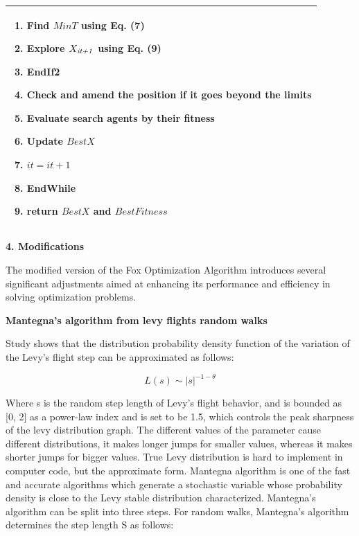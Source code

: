 \documentclass[
]{article}
\begin{document}
\begin{justify}
{\begin{longtable}{@{}p{\dimexpr\linewidth-2\tabcolsep\relax}@{}}
\begin{minipage}[t]{\linewidth}
\begin{enumerate}
  \item \hspace{1cm} Find $MinT$ using Eq. (7)
  \item \hspace{1cm} Explore $X_{\text{\textit{it+1}}}$ using Eq. (9)
  \item \hspace{0.5cm} \textbf{EndIf2}
  \item \hspace{0.5cm} Check and amend the position if it goes beyond the limits
  \item \hspace{0.5cm} Evaluate search agents by their fitness
  \item \hspace{0.5cm} Update $BestX$
  \item \hspace{0.5cm} $it=it+1$
  \item \textbf{EndWhile}
  \item return $BestX$ and $BestFitness$
\end{enumerate}
\end{minipage} \\
\bottomrule
\end{longtable}

\def\labelenumi{\arabic{enumi}.}
\item
\vspace{5mm}
  \textbf{4. Modifications}

The modified version of the Fox Optimization Algorithm introduces several significant adjustments aimed at enhancing its performance and efficiency in solving optimization problems.

\textbf{Mantegna’s algorithm from levy flights random walks}

Study shows that the distribution probability density function of the variation of the Levy’s flight step can be approximated as follows:

\begin{equation}
L(s) \sim |s|^{-1 - \theta} \tag{10}
\end{equation}

Where s is the random step length of Levy’s flight behavior, and 
 is bounded as [0, 2] as a power-law index and is set to be 1.5, which controls the peak sharpness of the levy distribution graph. The different values of the parameter 
 cause different distributions, it makes longer jumps for smaller values, whereas it makes shorter jumps for bigger values. True Levy distribution is hard to implement in computer code, but the approximate form. Mantegna algorithm is one of the fast and accurate algorithms which generate a stochastic variable whose probability density is close to the Levy stable distribution characterized. Mantegna’s algorithm can be split into three steps. For random walks, Mantegna’s algorithm determines the step length S as follows:

}
\end{justify}
\end{document}

